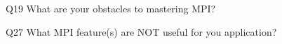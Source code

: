 \begin{description}%
\item{Q19} What are your obstacles to mastering MPI?%
\item{Q27} What MPI feature(s) are NOT useful for you application?%
\end{description}%
